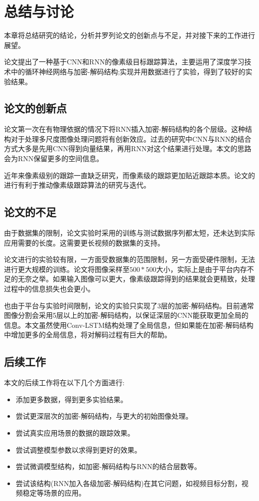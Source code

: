 
\chapter{总结与讨论}
本章将总结研究的结论，分析并罗列论文的创新点与不足，并对接下来的工作进行展望。
\par
论文提出了一种基于CNN和RNN的像素级目标跟踪算法，主要运用了深度学习技术中的循环神经网络与加密-解码结构;实现并用数据进行了实验，得到了较好的实验结果。
\section{论文的创新点}
论文第一次在有物理依据的情况下将RNN插入加密-解码结构的各个层级。这种结构对于处理多尺度图像处理问题将有创新效应。过去的研究中CNN与RNN的结合方式大多是先用CNN得到向量结果，再用RNN对这个结果进行处理。本文的思路会为RNN保留更多的空间信息。
\par
近年来像素级别的跟踪一直缺乏研究，而像素级的跟踪更加贴近跟踪本质。论文的进行有利于推动像素级跟踪算法的研究与迭代。
\section{论文的不足}
由于数据集的限制，论文实验时采用的训练与测试数据序列都太短，还未达到实际应用需要的长度。这需要更长视频的数据集的支持。
\par
论文进行的实验较有限，一方面受数据集的范围限制，另一方面受硬件限制，无法进行更大规模的训练。论文将图像采样至$500*500$大小，实际上是由于平台内存不足的无奈之举。如果输入图像可以更大，像素级跟踪得到的结果就会更精致，处理过程中的信息损失也会更小。
\par
也由于平台与实验时间限制，论文的实验只实现了3层的加密-解码结构。目前通常图像分割会采用5层以上的加密-解码结构，以保证深层的CNN能获取更加全局的信息。本文虽然使用Conv-LSTM结构处理了全局信息，但如果能在加密-解码结构中增加更多的全局信息，将对解码过程有巨大的帮助。
\section{后续工作}
本文的后续工作将在以下几个方面进行:
\begin{itemize}
    \item 添加更多数据，得到更多实验结果。
    \item 尝试更深层次的加密-解码结构，与更大的初始图像处理。
    \item 尝试真实应用场景的数据的跟踪效果。
    \item 尝试调整模型参数以求得到更好的效果。
    \item 尝试微调模型结构，如加密-解码结构与RNN的结合层数等。
    \item 尝试该结构(RNN加入各级加密-解码结构)在其它问题，如视频目标分割，视频稳定\supercite{benchme}等场景的应用。
\end{itemize}

